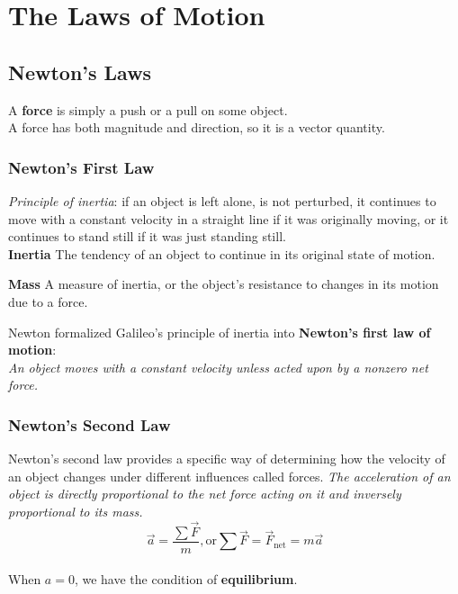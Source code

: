 \documentclass[11pt,letter]{report}
\begin{document}
\chapter*{The Laws of Motion}


\section{Newton's Laws}
A \textbf{force} is simply a push or a pull on some object.\\A force has both magnitude and direction, so it is a vector quantity.

\subsection{Newton's First Law}
\textit{Principle of inertia}: if an object is left alone, is not perturbed, it continues to move with a constant velocity in a straight line if it was originally moving, or it continues to stand still if it was just standing still.
\\\textbf{Inertia} The tendency of an object to continue in its original state of motion.

\hspace{1mm}

\noindent
\textbf{Mass} A measure of inertia, or the object's resistance to changes in its motion due to a force.

\hspace{1mm}

\noindent
Newton formalized Galileo's principle of inertia into \textbf{Newton's first law of motion}:\\\emph{An object moves with a constant velocity unless acted upon by a nonzero net force.}

\subsection{Newton's Second Law}
Newton's second law provides a specific way of determining how the velocity of an object changes under different influences called forces.
\emph{The acceleration of an object is directly proportional to the net force acting on it and inversely proportional to its mass.}
$$\vec{a} = \frac{\sum \vec{F}}{m} \mathrm{, or } \sum{\vec{F}} = \vec{F}_\mathrm{net} = m \vec{a}$$
\\When $a = 0$, we have the condition of \textbf{equilibrium}.

\hspace{1mm}
\end{document}
